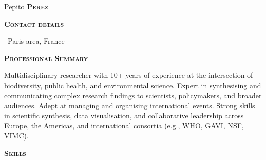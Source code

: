 \documentclass[9pt, a4paper]{article}
\newcommand{\headleft}[1]{\vspace*{3ex}\textsc{\textbf{#1}}\par%
    \vspace*{-1.5ex}\hrulefill\par\vspace*{0.7ex}}
\begin{document}
\setlength{\topskip}{0pt}
\setlength{\parindent}{0pt}
\setlength{\parskip}{0pt}
\setlength{\fboxsep}{0pt}
\pagestyle{empty}
\raggedbottom

\begin{minipage}[t]{0.33\textwidth} %
\colorbox{cvblue}{\begin{minipage}[t][5mm][t]{\textwidth}\null\hfill\null\end{minipage}}

\vspace{-.2ex} %
\colorbox{cvblue!90}{\color{white}  %
\textwidth\relax%
\begin{minipage}[t][293mm][t]{0.82\textwidth}
\raggedright
\vspace*{2.5ex}

\Large Pepito \textbf{\textsc{Perez}} \normalsize 


\headleft{Contact details}
\small %
\Letter\ Paris area, France
\normalsize

\vspace*{0.5ex} %

\headleft{Professional Summary}
Multidisciplinary researcher with 10+ years of experience at the intersection of biodiversity, public health, and environmental science. Expert in synthesising and communicating complex research findings to scientists, policymakers, and broader audiences. Adept at managing and organising international events. Strong skills in scientific synthesis, data visualisation, and collaborative leadership across Europe, the Americas, and international consortia (e.g., WHO, GAVI, NSF, VIMC).

\headleft{Skills}
\begin{itemize}


\end{itemize}
\end{minipage}}
\end{minipage}
\end{document}
